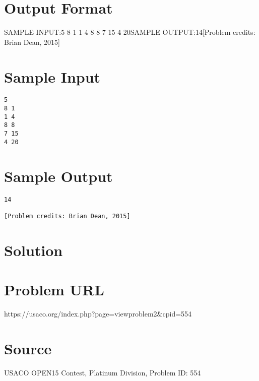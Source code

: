 \documentclass[12pt]{article}
\begin{document}
\section*{Output Format}
SAMPLE INPUT:5
8 1
1 4
8 8
7 15
4 20SAMPLE OUTPUT:14[Problem credits: Brian Dean, 2015]

\section*{Sample Input}
\begin{verbatim}
5
8 1
1 4
8 8
7 15
4 20
\end{verbatim}

\section*{Sample Output}
\begin{verbatim}
14

[Problem credits: Brian Dean, 2015]
\end{verbatim}

\section*{Solution}


\section*{Problem URL}
https://usaco.org/index.php?page=viewproblem2&cpid=554

\section*{Source}
USACO OPEN15 Contest, Platinum Division, Problem ID: 554
\end{document}
